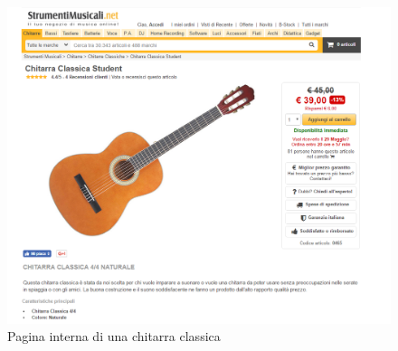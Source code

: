 \documentclass[12pt]{article}
\begin{document}
	 \begin{figure}
	 	\centering	
	 	\includegraphics[width=180mm]{images/paginaProdotto.png}
	 	\caption{Pagina interna di una chitarra classica}
	 \end{figure}
 	\newpage
\end{document}
